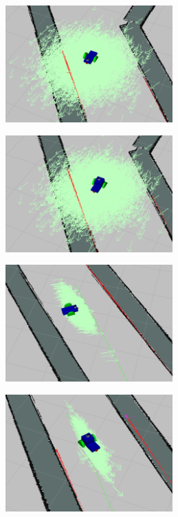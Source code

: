 \documentclass[a4paper]{article}
\begin{document}
\begin{minipage}{0.45\textwidth}
\centering
\includegraphics[height=4.5cm]{og_model_1}
\end{minipage}
\hspace{1cm}
\begin{minipage}{0.45\textwidth}
\centering
\includegraphics[height=4.5cm]{new_model_1}
\end{minipage}

\begin{minipage}{0.45\textwidth}
\centering
\includegraphics[height=4.5cm]{og_model_2}
\end{minipage}
\hspace{1cm}
\begin{minipage}{0.45\textwidth}
\centering
\includegraphics[height=4.5cm]{new_model_2}
\end{minipage}
\end{document}
